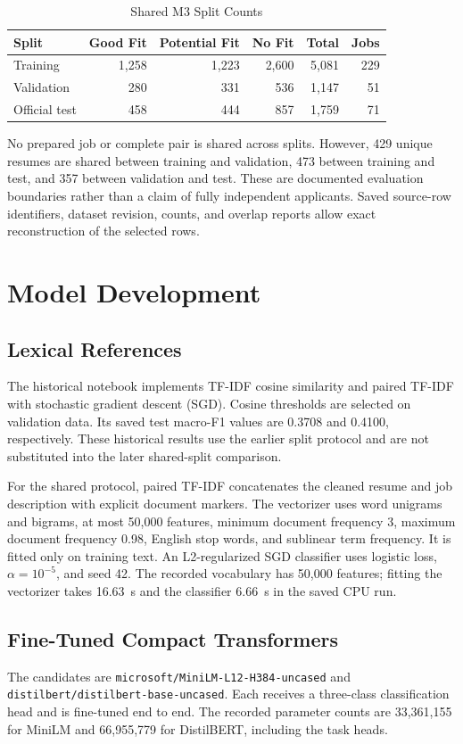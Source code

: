 \documentclass[conference,a4paper]{IEEEtran}
\newcommand{\GF}{Good Fit}
\newcommand{\PF}{Potential Fit}
\newcommand{\NF}{No Fit}
\begin{document}
\begin{table}[t]
\caption{Shared M3 Split Counts}
\label{tab:splits}
\centering\footnotesize
\begin{tabular}{lrrrrr}
\toprule
Split & \GF & \PF & \NF & Total & Jobs\\
\midrule
Training & 1,258 & 1,223 & 2,600 & 5,081 & 229\\
Validation & 280 & 331 & 536 & 1,147 & 51\\
Official test & 458 & 444 & 857 & 1,759 & 71\\
\bottomrule
\end{tabular}
\end{table}

No prepared job or complete pair is shared across splits. However, 429 unique resumes are shared between training and validation, 473 between training and test, and 357 between validation and test. These are documented evaluation boundaries rather than a claim of fully independent applicants. Saved source-row identifiers, dataset revision, counts, and overlap reports allow exact reconstruction of the selected rows.

\section{Model Development}
\subsection{Lexical References}
The historical notebook implements TF-IDF cosine similarity and paired TF-IDF with stochastic gradient descent (SGD). Cosine thresholds are selected on validation data. Its saved test macro-F1 values are 0.3708 and 0.4100, respectively. These historical results use the earlier split protocol and are not substituted into the later shared-split comparison.

For the shared protocol, paired TF-IDF concatenates the cleaned resume and job description with explicit document markers. The vectorizer uses word unigrams and bigrams, at most 50,000 features, minimum document frequency 3, maximum document frequency 0.98, English stop words, and sublinear term frequency. It is fitted only on training text. An L2-regularized SGD classifier uses logistic loss, $\alpha=10^{-5}$, and seed 42. The recorded vocabulary has 50,000 features; fitting the vectorizer takes 16.63~s and the classifier 6.66~s in the saved CPU run.

\subsection{Fine-Tuned Compact Transformers}
The candidates are \nolinkurl{microsoft/MiniLM-L12-H384-uncased} and \nolinkurl{distilbert/distilbert-base-uncased}. Each receives a three-class classification head and is fine-tuned end to end. The recorded parameter counts are 33,361,155 for MiniLM and 66,955,779 for DistilBERT, including the task heads.
\end{document}

